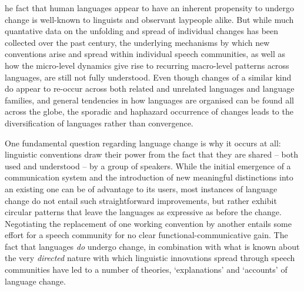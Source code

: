 



he fact that human languages appear to have an inherent propensity to undergo change is well-known to linguists and observant laypeople alike.
But while much quantative data on the unfolding and spread of individual changes has been collected over the past century, the underlying mechanisms by which new conventions arise and spread within individual speech communities, as well as how the micro-level dynamics give rise to recurring macro-level patterns across languages, are still not fully understood.
Even though changes of a similar kind do appear to re-occur across both related and unrelated languages and language families, and general tendencies in how languages are organised can be found all across the globe, the sporadic and haphazard occurrence of changes leads to the diversification of languages rather than convergence.

One fundamental question regarding language change is why it occurs at all: linguistic conventions draw their power from the fact that they are shared -- both used and understood -- by a group of speakers. While the initial emergence of a communication system and the introduction of new meaningful distinctions into an existing one can be of advantage to its users, most instances of language change do not entail such straightforward improvements, 
but rather exhibit circular patterns that leave the languages as expressive as before the change. Negotiating the replacement of one working convention by another entails some effort for a speech community for no clear functional-communicative gain.
The fact that languages \emph{do} undergo change, in combination with what is known about the very \emph{directed} nature with which linguistic innovations spread through speech communities have led to a number of theories, `explanations' and `accounts' of language change.

